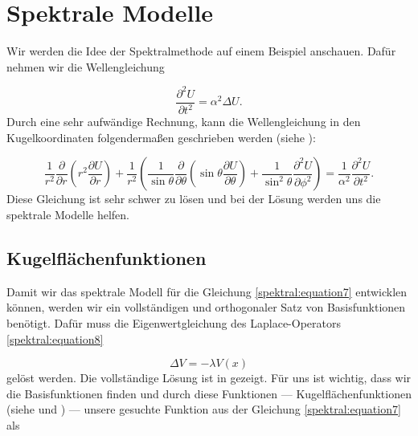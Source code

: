 %
%
%
%
\section{Spektrale Modelle 
\label{spektral:section:spektralemodelle}}

Wir werden die Idee der Spektralmethode auf einem Beispiel anschauen. Dafür nehmen wir die Wellengleichung

\begin{equation}
 \dfrac{\partial^2U}{\partial{t^2}} = \alpha^2\Delta{U}.
\label{spektral:equation7}
\end{equation}
Durch eine sehr aufwändige Rechnung, kann die Wellengleichung in den Kugelkoordinaten folgendermaßen geschrieben werden (siehe \cite[Anhang B]{spektral:QuantenmechanikMathemathischesSeminar}):

\begin{equation}
 \frac{1}{r^2}\frac{\partial}{\partial{r}}\left(r^2\frac{\partial{U}}{\partial{r}}\right) + \frac{1}{r^2}\left(\frac{1}{\sin\theta}\frac{\partial}{\partial{\theta}}\left(\sin\theta\frac{\partial{U}}{\partial{\theta}}\right) + \frac{1}{\sin^2\theta}\frac{\partial^2{U}}{\partial{\phi^2}}\right) = \frac{1}{\alpha^2}\frac{\partial^2{U}}{\partial{t^2}}.
\label{spektral:equation8}
\end{equation}
Diese Gleichung ist sehr schwer zu lösen und bei der Lösung werden uns die spektrale Modelle helfen.

\subsection{Kugelflächenfunktionen
\label{spektral:subsection:kugelflaechenfunktionen}}

Damit wir das spektrale Modell für die Gleichung \eqref{spektral:equation7} entwicklen können, werden wir ein vollständigen und orthogonaler Satz von Basisfunktionen benötigt.
Dafür muss die Eigenwertgleichung des Laplace-Operators \eqref{spektral:equation8}

\begin{equation}
 \Delta{V} = -\lambda{V(x)}
\label{spektral:equation9}
\end{equation}
gelöst werden.
Die vollständige Lösung ist in \cite[Seite 62]{spektral:NichtkommutativeBildvearbeitung} gezeigt.
Für uns ist wichtig, dass wir die Basisfunktionen finden und durch diese Funktionen --- Kugelflächenfunktionen (siehe \cite{spektral:MathsemSpezfunk} und \cite{spektral:NichtkommutativeBildvearbeitung}) --- unsere gesuchte Funktion aus der Gleichung \eqref{spektral:equation7} als

